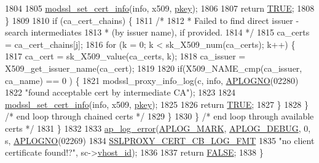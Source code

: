 \begin{DoxyCode}
1804 
1805                 \hyperlink{ssl__engine__kernel_8c_a044d627b253f550acf4e32f6ce16cfbe}{modssl\_set\_cert\_info}(info, x509, \hyperlink{group__APR__Util__DBM_ga1bbfe97dd2f6cc19a02af7fd6ef61fbd}{pkey});
1806 
1807                 \textcolor{keywordflow}{return} \hyperlink{group__MOD__SSL__PRIVATE_gaa8cecfc5c5c054d2875c03e77b7be15d}{TRUE};
1808             \}
1809 
1810             \textcolor{keywordflow}{if} (ca\_cert\_chains) \{
1811                 \textcolor{comment}{/*}
1812 \textcolor{comment}{                 * Failed to find direct issuer - search intermediates}
1813 \textcolor{comment}{                 * (by issuer name), if provided.}
1814 \textcolor{comment}{                 */}
1815                 ca\_certs = ca\_cert\_chains[j];
1816                 \textcolor{keywordflow}{for} (k = 0; k < sk\_X509\_num(ca\_certs); k++) \{
1817                     ca\_cert = sk\_X509\_value(ca\_certs, k);
1818                     ca\_issuer = X509\_get\_issuer\_name(ca\_cert);
1819 
1820                     \textcolor{keywordflow}{if}(X509\_NAME\_cmp(ca\_issuer, ca\_name) == 0 ) \{
1821                         modssl\_proxy\_info\_log(c, info, \hyperlink{group__APACHE__CORE__LOG_ga1dee8a07e06bc5b3de8b89662c2cd666}{APLOGNO}(02280)
1822                                               \textcolor{stringliteral}{"found acceptable cert by intermediate CA"});
1823 
1824                         \hyperlink{ssl__engine__kernel_8c_a044d627b253f550acf4e32f6ce16cfbe}{modssl\_set\_cert\_info}(info, x509, 
      \hyperlink{group__APR__Util__DBM_ga1bbfe97dd2f6cc19a02af7fd6ef61fbd}{pkey});
1825 
1826                         \textcolor{keywordflow}{return} \hyperlink{group__MOD__SSL__PRIVATE_gaa8cecfc5c5c054d2875c03e77b7be15d}{TRUE};
1827                     \}
1828                 \} \textcolor{comment}{/* end loop through chained certs */}
1829             \}
1830         \} \textcolor{comment}{/* end loop through available certs */}
1831     \}
1832 
1833     \hyperlink{group__APACHE__CORE__LOG_ga5e6676c87418af7a1d323a116c78ecb4}{ap\_log\_error}(\hyperlink{group__APACHE__CORE__LOG_ga655e126996849bcb82e4e5a14c616f4a}{APLOG\_MARK}, \hyperlink{group__APACHE__CORE__LOG_gadfcef90537539cf2b7d35cfbbbafeb93}{APLOG\_DEBUG}, 0, s, 
      \hyperlink{group__APACHE__CORE__LOG_ga1dee8a07e06bc5b3de8b89662c2cd666}{APLOGNO}(02269)
1834                  \hyperlink{ssl__engine__kernel_8c_a686b5690c7c4712e04b3ad60f4d4eb76}{SSLPROXY\_CERT\_CB\_LOG\_FMT}
1835                  \textcolor{stringliteral}{"no client certificate found!?"}, sc->\hyperlink{structSSLSrvConfigRec_a0517c50274f512bac682d23e0143f46d}{vhost\_id});
1836 
1837     \textcolor{keywordflow}{return} \hyperlink{group__MOD__SSL__PRIVATE_gaa93f0eb578d23995850d61f7d61c55c1}{FALSE};
1838 \}
\end{DoxyCode}


